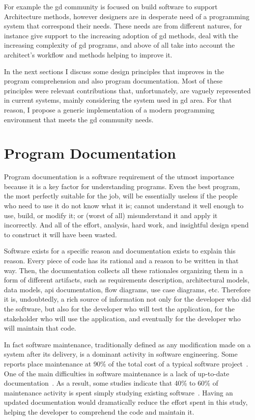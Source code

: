 For example the \gls{gd} community is focused on build software to support Architecture methods, however designers are in desperate need of a programming system that correspond their needs. These needs are from different natures, for instance give support to the increasing adoption of \gls{gd} methods, deal with the increasing complexity of \gls{gd} programs, and above of all take into account the architect's workflow and methods helping to improve it.

In the next sections I discuss some design principles that improves in the program comprehension and also program documentation. Most of these principles were relevant contributions that, unfortunately, are vaguely represented in current systems, mainly considering the system used in \gls{gd} area. For that reason, I propose a generic implementation of a modern programming environment that meets the \gls{gd} community needs. 

\section{Program Documentation}

Program documentation is a software requirement of the utmost importance because it is a key factor for understanding programs. Even the best program, the most perfectly suitable for the job, will be essentially useless if the people who need to use it do not know what it is; cannot understand it well enough to use, build, or modify it; or (worst of all) misunderstand it and apply it incorrectly. And all of the effort, analysis, hard work, and insightful design spend to construct it will have been wasted.

Software exists for a specific reason and documentation exists to explain this reason. Every piece of code has its rational and a reason to be written in that way. Then, the documentation collects all these rationales organizing them in a form of different artifacts, such as requirements description, architectural models, data models, \gls{api} documentation, flow diagrams, use case diagrams, etc. Therefore it is, undoubtedly, a rich source of information not only for the developer who did the software, but also for the developer who will test the application, for the stakeholder who will use the application, and eventually for the developer who will maintain that code.

In fact software maintenance, traditionally defined as any modification made on a system after its delivery, is a dominant activity in software engineering. Some reports place maintenance at 90\% of the total cost of a typical software project~\citep{seacord2003modernizing,pigoski1996practical}. One of the main difficulties in software maintenance is a lack of up-to-date documentation~\citep{de2005study}. As a result, some studies indicate that 40\% to 60\% of maintenance activity is spent simply studying existing software~\citep[p. 475 and p. 35 respectively]{pigoski1996practical,pfleeger1998software}. Having an updated documentation would dramatically reduce the effort spent in this study, helping the developer to comprehend the code and maintain it.

